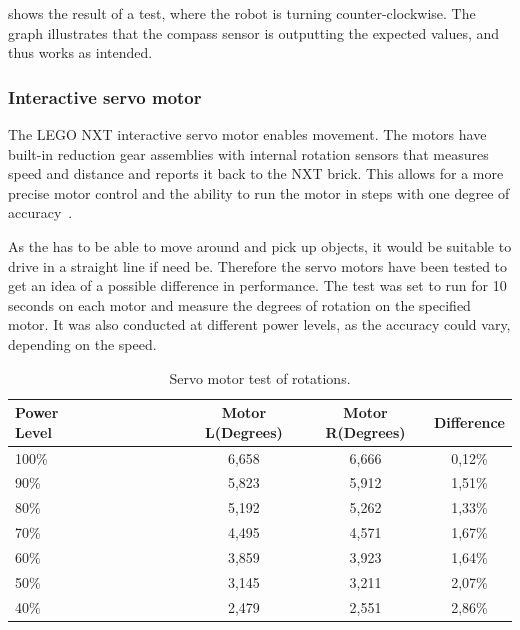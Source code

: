  shows the result of a test, where the robot is turning counter-clockwise. The graph illustrates that the compass sensor is outputting the expected values, and thus works as intended. 

\subsubsection{Interactive servo motor} \label{sec:servo_motor}
The LEGO NXT interactive servo motor enables movement. The motors have built-in reduction gear assemblies with internal rotation sensors that measures speed and distance and reports it back to the NXT brick. This allows for a more precise motor control and the ability to run the motor in steps with one degree of accuracy~\citep{lego_education}.

As the \projname{} has to be able to move around and pick up objects, it would be suitable to drive in a straight line if need be. Therefore the servo motors have been tested to get an idea of a possible difference in performance. The test was set to run for 10 seconds on each motor and measure the degrees of rotation on the specified motor. It was also conducted at different power levels, as the accuracy could vary, depending on the speed. 

\begin{table}[H]
	\centering
    \begin{tabular}{lccc}
    \hline  
    \rowcolor{DGray}
    \textbf{Power Level}~~~~~~~~~~~~ & Motor L(Degrees) & Motor R(Degrees) & Difference \\ \hline 
    100\%                  & 6,658                  & 6,666                & 0,12\% \\
    90\%                   & 5,823                  & 5,912                & 1,51\% \\
    80\%                   & 5,192                  & 5,262                & 1,33\% \\
    70\%                   & 4,495                  & 4,571                & 1,67\% \\
    60\%                   & 3,859                  & 3,923                & 1,64\% \\
    50\%                   & 3,145                  & 3,211                & 2,07\% \\
    40\%                   & 2,479                  & 2,551                & 2,86\% \\
    \hline 
    \end{tabular}
    \caption{\label{table:servo_motor_test} Servo motor test of rotations.}
\end{table}

